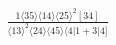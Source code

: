 \documentclass[varwidth, border=5pt]{standalone}
\begin{document}
\begin{my}
$\begin{gathered}
\scriptscriptstyle\frac{1⟨35⟩⟨14⟩⟨25⟩^2[34]}{⟨13⟩^2⟨24⟩⟨45⟩⟨4|1+3|4]}
\end{gathered}$
\end{my}
\end{document}
